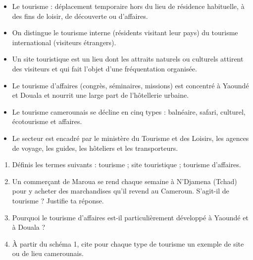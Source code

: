\documentclass[11pt]{article}
\newcommand{\cle}[1]{{\popxbold\color{popdark}#1}}
\begin{document}
\begin{aretenir}
\begin{itemize}
\item Le \cle{tourisme} : déplacement temporaire hors du lieu de résidence habituelle, à des fins de loisir, de découverte ou d'affaires.
\item On distingue le \cle{tourisme interne} (résidents visitant leur pays) du \cle{tourisme international} (visiteurs étrangers).
\item Un \cle{site touristique} est un lieu dont les attraits naturels ou culturels attirent des visiteurs et qui fait l'objet d'une fréquentation organisée.
\item Le \cle{tourisme d'affaires} (congrès, séminaires, missions) est concentré à Yaoundé et Douala et nourrit une large part de l'hôtellerie urbaine.
\item Le tourisme camerounais se décline en cinq types : balnéaire, safari, culturel, écotourisme et affaires.
\item Le secteur est encadré par le ministère du Tourisme et des Loisirs, les agences de voyage, les guides, les hôteliers et les transporteurs.
\end{itemize}
\end{aretenir}

\begin{exercice}
\begin{enumerate}
\item Définis les termes suivants : tourisme ; site touristique ; tourisme d'affaires.
\item Un commerçant de Maroua se rend chaque semaine à N'Djamena (Tchad) pour y acheter des marchandises qu'il revend au Cameroun. S'agit-il de tourisme ? Justifie ta réponse.
\item Pourquoi le tourisme d'affaires est-il particulièrement développé à Yaoundé et à Douala ?
\item À partir du schéma 1, cite pour chaque type de tourisme un exemple de site ou de lieu camerounais.
\end{enumerate}
\end{exercice}
\end{document}
